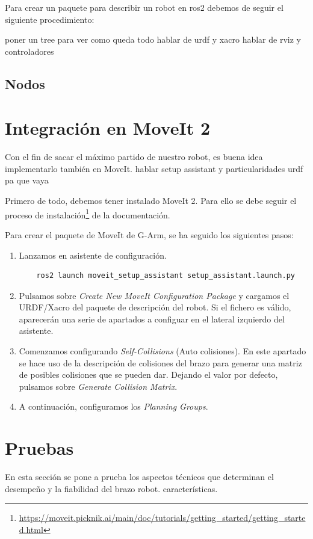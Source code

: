 Para crear un paquete para describir un robot en ros2 debemos de seguir el siguiente procedimiento:



poner un tree para ver como queda todo 
hablar de urdf y xacro
hablar de rviz y controladores



\subsection{Nodos}


\newpage
\section{Integración en MoveIt 2}
Con el fin de sacar el máximo partido de nuestro robot, es buena idea implementarlo también en MoveIt.
hablar setup assistant y particularidades urdf pa que vaya

Primero de todo, debemos tener instalado MoveIt 2. Para ello se debe seguir el proceso de 
instalación\footnote{\url{https://moveit.picknik.ai/main/doc/tutorials/getting_started/getting_started.html}} de la documentación.

Para crear el paquete de MoveIt de G-Arm, se ha seguido los siguientes pasos:
\begin{enumerate}
\item Lanzamos en asistente de configuración.
\begin{verbatim}
    ros2 launch moveit_setup_assistant setup_assistant.launch.py
\end{verbatim}
\item Pulsamos sobre \textit{Create New MoveIt Configuration Package} y cargamos el URDF/Xacro del paquete de descripción 
del robot. Si el fichero es válido, aparecerán una serie de apartados a configuar en el lateral izquierdo del asistente. 
\item Comenzamos configurando \textit{Self-Collisions} (Auto colisiones). En este apartado se hace uso de la descripción 
de colisiones del brazo para generar una matriz de posibles colisiones que se pueden dar. Dejando el valor 
por defecto, pulsamos sobre \textit{Generate Collision Matrix}.
\item A continuación, configuramos los \textit{Planning Groups}. 
\end{enumerate}


\section{Pruebas}
En esta sección se pone a prueba los aspectos técnicos que determinan el desempeño y la fiabilidad del brazo robot. 
características.

